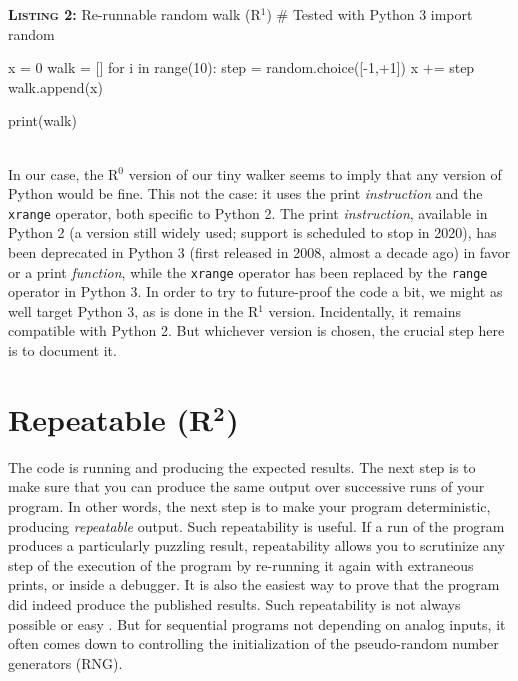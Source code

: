 \documentclass[a4paper,11pt]{article}
\begin{document}
\noindent \begin{minipage}[c]{\linewidth}
\begin{code}{\textbf{\textsc{Listing 2:}} Re-runnable random walk (R$^1$)}
# Tested with Python 3
import random

x =  0
walk = []
for i in range(10):
    step = random.choice([-1,+1])
    x += step
    walk.append(x)

print(walk)
\end{code}
\end{minipage}\\

In our case, the R$^0$ version of our tiny walker seems to imply that any version of Python would be fine. This not the case: it uses the print {\em instruction} and the {\tt xrange} operator, both specific to Python 2. The print {\em instruction}, available in Python 2 (a version still widely used; support is scheduled to stop in 2020), has been deprecated in Python 3 (first released in 2008, almost a decade ago) in favor or a  print {\em function}, while the {\tt xrange} operator has been replaced by the {\tt range} operator in Python 3. In order to try to future-proof the code a bit, we might as well target Python 3, as is done in the R$^1$ version. Incidentally, it remains compatible with Python 2. But whichever version is chosen, the crucial step here is to document it.


\section*{Repeatable (R$^{\mathbf 2}$)}

The code is running and producing the expected results. The next step is to make sure that you can produce the same output over successive runs of your program. In other words, the next step is to make your program deterministic, producing {\em repeatable} output. Such repeatability is useful. If a run of the program produces a particularly puzzling result, repeatability allows you to scrutinize any step of the execution of the program by re-running it again with extraneous prints, or inside a debugger. It is also the easiest way to prove that the program did indeed produce the published results. Such repeatability is not always possible or easy \citep{Diethelm:2012, Courtes:2015}. But for sequential programs not depending on analog inputs, it often comes down to controlling the initialization of the pseudo-random number generators (RNG).\\
\end{document}
